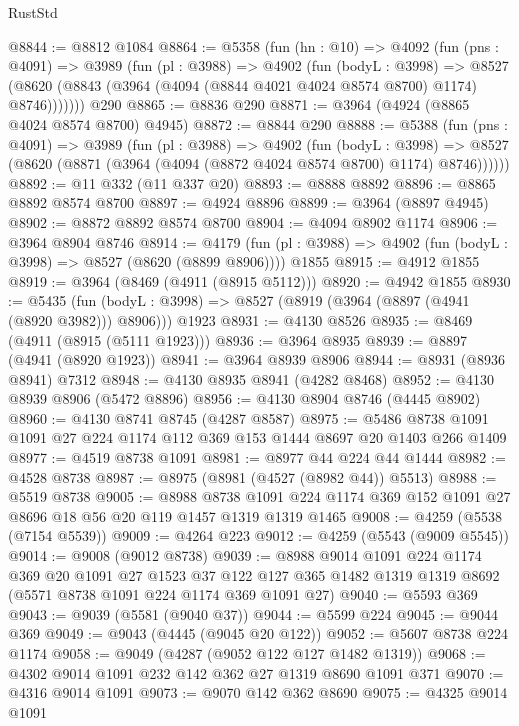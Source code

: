 \begin{lexlean}{RustStd}
\begin{coremodule}
{\begin{coremodule}
{{{{{{{{{{{{{{{{{{{{{{{{{{{{{{{{{{{{{{@8844 := @8812 @1084
@8864 := @5358
    (fun (hn : @10) =>
    @4092
      (fun (pns : @4091) =>
      @3989
        (fun (pl : @3988) =>
        @4902
          (fun (bodyL : @3998) =>
          @8527 (@8620 (@8843 (@3964 (@4094 (@8844 @4021 @4024 @8574 @8700) @1174) @8746)))))))
    @290
@8865 := @8836 @290
@8871 := @3964 (@4924 (@8865 @4024 @8574 @8700) @4945)
@8872 := @8844 @290
@8888 := @5388
    (fun (pns : @4091) =>
    @3989
      (fun (pl : @3988) =>
      @4902
        (fun (bodyL : @3998) =>
        @8527 (@8620 (@8871 (@3964 (@4094 (@8872 @4024 @8574 @8700) @1174) @8746))))))
@8892 := @11 @332 (@11 @337 @20)
@8893 := @8888 @8892
@8896 := @8865 @8892 @8574 @8700
@8897 := @4924 @8896
@8899 := @3964 (@8897 @4945)
@8902 := @8872 @8892 @8574 @8700
@8904 := @4094 @8902 @1174
@8906 := @3964 @8904 @8746
@8914 := @4179
    (fun (pl : @3988) => @4902 (fun (bodyL : @3998) => @8527 (@8620 (@8899 @8906))))
    @1855
@8915 := @4912 @1855
@8919 := @3964 (@8469 (@4911 (@8915 @5112)))
@8920 := @4942 @1855
@8930 := @5435
    (fun (bodyL : @3998) => @8527 (@8919 (@3964 (@8897 (@4941 (@8920 @3982))) @8906)))
    @1923
@8931 := @4130 @8526
@8935 := @8469 (@4911 (@8915 (@5111 @1923)))
@8936 := @3964 @8935
@8939 := @8897 (@4941 (@8920 @1923))
@8941 := @3964 @8939 @8906
@8944 := @8931 (@8936 @8941) @7312
@8948 := @4130 @8935 @8941 (@4282 @8468)
@8952 := @4130 @8939 @8906 (@5472 @8896)
@8956 := @4130 @8904 @8746 (@4445 @8902)
@8960 := @4130 @8741 @8745 (@4287 @8587)
@8975 := @5486 @8738 @1091 @1091 @27 @224 @1174 @112 @369 @153 @1444 @8697 @20 @1403 @266 @1409
@8977 := @4519 @8738 @1091
@8981 := @8977 @44 @224 @44 @1444
@8982 := @4528 @8738
@8987 := @8975 (@8981 (@4527 (@8982 @44)) @5513)
@8988 := @5519 @8738
@9005 := @8988
    @8738
    @1091
    @224
    @1174
    @369
    @152
    @1091
    @27
    @8696
    @18
    @56
    @20
    @119
    @1457
    @1319
    @1319
    @1465
@9008 := @4259 (@5538 (@7154 @5539))
@9009 := @4264 @223
@9012 := @4259 (@5543 (@9009 @5545))
@9014 := @9008 (@9012 @8738)
@9039 := @8988
    @9014
    @1091
    @224
    @1174
    @369
    @20
    @1091
    @27
    @1523
    @37
    @122
    @127
    @365
    @1482
    @1319
    @1319
    @8692
    (@5571 @8738 @1091 @224 @1174 @369 @1091 @27)
@9040 := @5593 @369
@9043 := @9039 (@5581 (@9040 @37))
@9044 := @5599 @224
@9045 := @9044 @369
@9049 := @9043 (@4445 (@9045 @20 @122))
@9052 := @5607 @8738 @224 @1174
@9058 := @9049 (@4287 (@9052 @122 @127 @1482 @1319))
@9068 := @4302 @9014 @1091 @232 @142 @362 @27 @1319 @8690 @1091 @371
@9070 := @4316 @9014 @1091
@9073 := @9070 @142 @362 @8690
@9075 := @4325 @9014 @1091
}}}}}}}}}}}}}}}}}}}}}}}}}}}}}}}}}}}}}}
\end{coremodule}}
\end{coremodule}
\end{lexlean}
